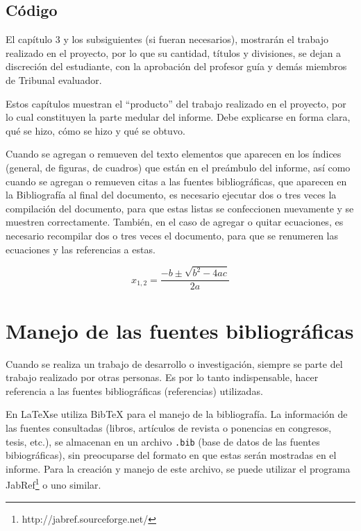 \subsection{Código}




\newpage

El capítulo 3 y los subsiguientes (si fueran necesarios), mostrarán el trabajo realizado en el proyecto, por lo que su cantidad, títulos y divisiones, se dejan a discreción del estudiante, con la aprobación del profesor guía y demás miembros de Tribunal evaluador.

Estos capítulos muestran el ``producto'' del trabajo realizado en el proyecto, por lo cual constituyen la parte medular del informe. Debe explicarse en forma clara, qué se hizo, cómo se hizo y qué se obtuvo.

Cuando se agregan o remueven del texto elementos que aparecen en los índices (general, de figuras, de cuadros) que están en el preámbulo del informe, así como cuando se agregan o remueven citas a las fuentes bibliográficas, que aparecen en la Bibliografía al final del documento, es necesario ejecutar dos o tres veces la compilación del documento, para que estas listas se confeccionen nuevamente y se muestren correctamente.  También, en el caso de agregar o quitar ecuaciones, es necesario recompilar dos o tres veces el documento, para que se renumeren las ecuaciones y  las referencias a estas.

\begin{equation}
x_{1,2} = \frac{-b \pm \sqrt{b^2 - 4ac}}{2a}
\end{equation}

\section{Manejo de las fuentes bibliográficas}
Cuando se realiza un trabajo de desarrollo o investigación, siempre se parte del trabajo realizado por otras personas. Es por lo tanto indispensable, hacer referencia a las fuentes bibliográficas (referencias) utilizadas.

En \LaTeX se utiliza BibTeX para el manejo de la bibliografía.  La información de las fuentes consultadas (libros, artículos de revista o ponencias en congresos, tesis, etc.), se almacenan en un archivo \texttt{.bib} (base de datos de las fuentes bibiográficas), sin preocuparse del formato en que estas serán mostradas en el informe.  Para la creación y manejo de este archivo, se puede utilizar el programa JabRef\footnote{http://jabref.sourceforge.net/} o uno similar.

